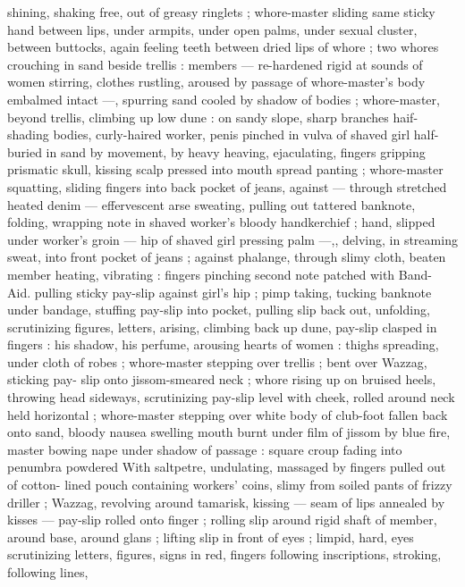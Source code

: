 shining, shaking free, out of greasy ringlets ; whore-master sliding 
same sticky hand between lips, under armpits, under open palms, 
under sexual cluster, between buttocks, again feeling teeth between 
dried lips of whore ; two whores crouching in sand beside trellis : 
members --- re-hardened rigid at sounds of women stirring, clothes 
rustling, aroused by passage of whore-master's body embalmed 
intact ---, spurring sand cooled by shadow of bodies ; whore-master, 
beyond trellis, climbing up low dune : on sandy slope, sharp 
branches haif-shading bodies, curly-haired worker, penis pinched in 
vulva of shaved girl half-buried in sand by movement, by heavy 
heaving, ejaculating, fingers gripping prismatic skull, kissing scalp 
pressed into mouth spread panting ; whore-master squatting, sliding 
fingers into back pocket of jeans, against --- through stretched 
heated denim --- effervescent arse sweating, pulling out tattered 
banknote, folding, wrapping note in shaved worker's bloody 
handkerchief ; hand, slipped under worker's groin --- hip of shaved 
girl pressing palm ---,, delving, in streaming sweat, into front pocket 
of jeans ; against phalange, through slimy cloth, beaten member 
heating, vibrating : fingers pinching second note patched with Band- 
Aid. pulling sticky pay-slip against girl's hip ; pimp taking, tucking 
banknote under bandage, stuffing pay-slip into pocket, pulling slip 
back out, unfolding, scrutinizing figures, letters, arising, climbing 
back up dune, pay-slip clasped in fingers : his shadow, his perfume, 
arousing hearts of women : thighs spreading, under cloth of robes ; 
whore-master stepping over trellis ; bent over Wazzag, sticking pay- 
slip onto jissom-smeared neck ; whore rising up on bruised heels, 
throwing head sideways, scrutinizing pay-slip level with cheek, rolled 
around neck held horizontal ; whore-master stepping over white body 
of club-foot fallen back onto sand, bloody nausea swelling mouth 
burnt under film of jissom by blue fire, master bowing nape under 
shadow of passage : square croup fading into penumbra powdered 
With saltpetre, undulating, massaged by fingers pulled out of cotton- 
lined pouch containing workers' coins, slimy from soiled pants of 
frizzy driller ; Wazzag, revolving around tamarisk, kissing --- seam of 
lips annealed by kisses --- pay-slip rolled onto finger ; rolling slip 
around rigid shaft of member, around base, around glans ; lifting slip 
in front of eyes ; limpid, hard, eyes scrutinizing letters, figures, signs 
in red, fingers following inscriptions, stroking, following lines, 
